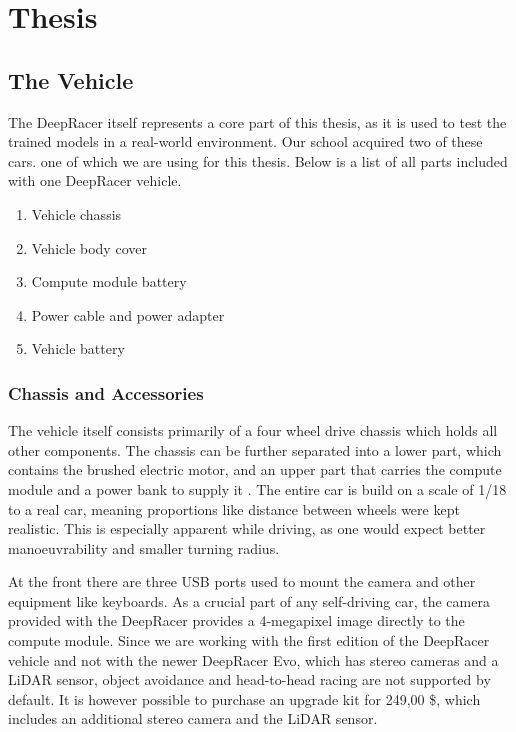 \chapter{Thesis}
\label{cha:Diplomschrift}

\section{The Vehicle}

The DeepRacer itself represents a core part of this thesis, as it is used to test the trained models in a real-world environment. Our school acquired two of these cars. one of which we are using for this thesis. Below is a list of all parts included with one DeepRacer vehicle.

\begin{enumerate}
    \item Vehicle chassis
    \item Vehicle body cover
    \item Compute module battery
    \item Power cable and power adapter
    \item Vehicle battery
\end{enumerate}

\subsection{Chassis and Accessories}
The vehicle itself consists primarily of a four wheel drive chassis which holds all other components. The chassis can be further separated into a lower part, which contains the brushed electric motor, and an upper part that carries the compute module and a power bank to supply it \cite{AWS19}. The entire car is build on a scale of 1/18 to a real car, meaning proportions like distance between wheels were kept realistic. This is especially apparent while driving, as one would expect better manoeuvrability and smaller turning radius.

At the front there are three USB ports used to mount the camera and other equipment like keyboards. As a crucial part of any self-driving car, the camera provided with the DeepRacer provides a 4-megapixel image directly to the compute module. Since we are working with the first edition of the DeepRacer vehicle and not with the newer DeepRacer Evo, which has stereo cameras and a LiDAR sensor, object avoidance and head-to-head racing are not supported by default. It is however possible to purchase an upgrade kit for 249,00 \$, which includes an additional stereo camera and the LiDAR sensor.

